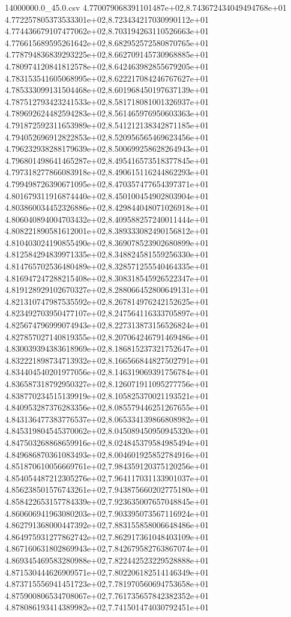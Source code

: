 \begin{filecontents*}{14000000.0_45.0.csv}
4.770079068391101487e+02,8.743672434049494768e+01
4.772257805373533301e+02,8.723434217030990112e+01
4.774436679107477062e+02,8.703194263110526663e+01
4.776615689595261642e+02,8.682952572580870765e+01
4.778794836839293225e+02,8.662709145730968885e+01
4.780974120841812578e+02,8.642463982855679205e+01
4.783153541605068995e+02,8.622217084246767627e+01
4.785333099131504468e+02,8.601968450197637139e+01
4.787512793423241533e+02,8.581718081001326937e+01
4.789692624482594283e+02,8.561465976950603363e+01
4.791872592311653989e+02,8.541212138342871185e+01
4.794052696912822853e+02,8.520956565469623456e+01
4.796232938288179639e+02,8.500699258628264943e+01
4.796801498641465287e+02,8.495416573518377845e+01
4.797318277866083918e+02,8.490615116244862293e+01
4.799498726390671095e+02,8.470357477654397371e+01
4.801679311916874440e+02,8.450100454902803904e+01
4.803860034452326886e+02,8.429844048071026918e+01
4.806040894004703432e+02,8.409588257240011444e+01
4.808221890581612001e+02,8.389333082490156812e+01
4.810403024190855490e+02,8.369078523902680899e+01
4.812584294839971335e+02,8.348824581559256330e+01
4.814765702536480489e+02,8.328571255540464335e+01
4.816947247288215408e+02,8.308318545926522347e+01
4.819128929102670327e+02,8.288066452800649131e+01
4.821310747987535592e+02,8.267814976242152625e+01
4.823492703950477107e+02,8.247564116333705897e+01
4.825674796999074943e+02,8.227313873156526824e+01
4.827857027140819355e+02,8.207064246791469486e+01
4.830039394383618969e+02,8.186815237321752647e+01
4.832221898734713932e+02,8.166566844827502791e+01
4.834404540201977056e+02,8.146319069391756784e+01
4.836587318792950327e+02,8.126071911095277756e+01
4.838770234515139919e+02,8.105825370021193521e+01
4.840953287376283356e+02,8.085579446251267655e+01
4.843136477383776537e+02,8.065334139866808982e+01
4.845319804545370062e+02,8.045089450950945320e+01
4.847503268868659916e+02,8.024845379584985494e+01
4.849686870361083493e+02,8.004601925852784916e+01
4.851870610056669761e+02,7.984359120375120256e+01
4.854054487212305276e+02,7.964117031133901037e+01
4.856238501576743261e+02,7.943875660202775180e+01
4.858422653157784339e+02,7.923635007657048845e+01
4.860606941963080203e+02,7.903395073567116924e+01
4.862791368000447392e+02,7.883155858006648486e+01
4.864975931277862742e+02,7.862917361048403109e+01
4.867160631802869943e+02,7.842679582763867074e+01
4.869345469583280988e+02,7.822442523229528888e+01
4.871530444626909571e+02,7.802206182514146349e+01
4.873715556941451723e+02,7.781970560694753658e+01
4.875900806534708067e+02,7.761735657842382352e+01
4.878086193414389982e+02,7.741501474030792451e+01

\end{filecontents*}
